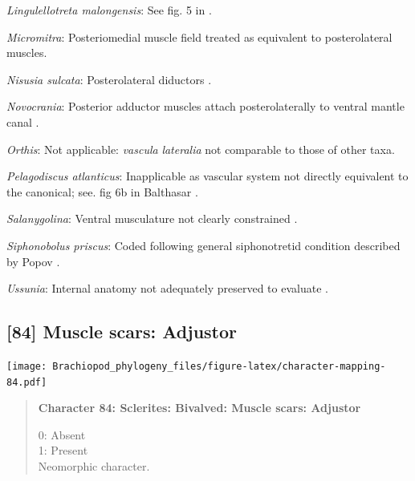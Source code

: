 \documentclass[openany]{book}
\begin{document}
\hypertarget{Lingulellotreta_malongensis-coding-83}{}
\emph{Lingulellotreta malongensis}: See fig. 5 in
\citet{Holmer1997EarlyCambrian}.

\hypertarget{Micromitra-coding-83}{}
\emph{Micromitra}: Posteriomedial muscle field \citep[text-fig.
6]{Williams1998Thediversity} treated as equivalent to posterolateral
muscles.

\hypertarget{Nisusia_sulcata-coding-83}{}
\emph{Nisusia sulcata}: Posterolateral diductors \citep[fig. 18.2
in][]{Bassett2001Functionalmorphology}.

\hypertarget{Novocrania-coding-83}{}
\emph{Novocrania}: Posterior adductor muscles attach posterolaterally to
ventral mantle canal \citep{Robinson2014Themuscles}.

\hypertarget{Orthis-coding-83}{}
\emph{Orthis}: Not applicable: \emph{vascula} \emph{lateralia} not
comparable to those of other taxa.

\hypertarget{Pelagodiscus_atlanticus-coding-83}{}
\emph{Pelagodiscus atlanticus}: Inapplicable as vascular system not
directly equivalent to the canonical; see. fig 6b in Balthasar
\citeyearpar{Balthasar2009Thebrachiopod}.

\hypertarget{Salanygolina-coding-83}{}
\emph{Salanygolina}: Ventral musculature not clearly constrained
\citep{Holmer2009Theenigmatic}.

\hypertarget{Siphonobolus_priscus-coding-83}{}
\emph{Siphonobolus priscus}: Coded following general siphonotretid
condition described by Popov \citeyearpar[p.~407]{Popov1992TheCambrian}.

\hypertarget{Ussunia-coding-83}{}
\emph{Ussunia}: Internal anatomy not adequately preserved to evaluate
\citep{Nikitin1984}.

\subsection*{{[}84{]} Muscle scars:
Adjustor}\label{muscle-scars-adjustor}

\texttt{[image: Brachiopod\_phylogeny\_files/figure-latex/character-mapping-84.pdf]}

\begin{quote}
\textbf{Character 84: Sclerites: Bivalved: Muscle scars: Adjustor}

0: Absent\\
1: Present\\
Neomorphic character.
\end{quote}
\end{document}
